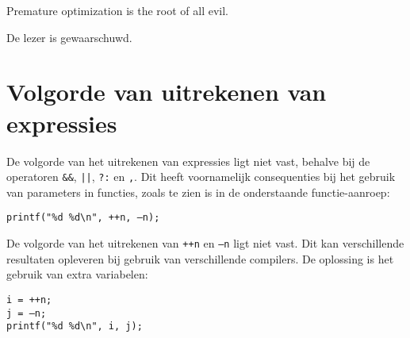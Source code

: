 \begin{displayquote}
Premature optimization is the root of all evil.
\end{displayquote}
De lezer is gewaarschuwd.

\section{Volgorde van uit\textsl{}rekenen van expressies}
De volgorde van het uitrekenen van expressies ligt niet vast, behalve bij de operatoren \texttt{\&\&}, \texttt{||}, \texttt{?:} en \texttt{,}. Dit heeft voornamelijk consequenties bij het gebruik van parameters in functies, zoals te zien is in de onderstaande functie-aanroep:

\hspace*{1em}\texttt{printf("{}\%d \%d\textbackslash n"{}, ++n, --n);}

De volgorde van het uitrekenen van \texttt{++n} en \texttt{--n} ligt niet vast. Dit kan verschillende resultaten opleveren bij gebruik van verschillende compilers. De oplossing is het gebruik van extra variabelen:

\hspace*{1em}\texttt{i = ++n;}\\
\hspace*{1em}\texttt{j = --n;}\\
\hspace*{1em}\texttt{printf("{}\%d \%d\textbackslash n"{}, i, j);}
